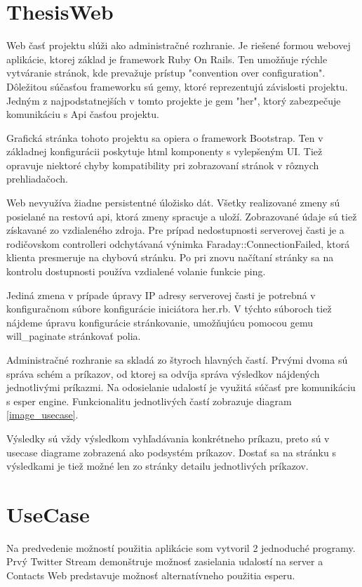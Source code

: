 \section{ThesisWeb}
	Web časť projektu slúži ako administračné rozhranie. Je riešené formou webovej aplikácie, ktorej základ je framework Ruby On Rails. Ten umožňuje rýchle vytváranie stránok, kde prevažuje prístup "convention over configuration". Dôležitou súčasťou frameworku sú gemy, ktoré reprezentujú závislosti projektu. Jedným z najpodstatnejších v tomto projekte je gem "her", ktorý zabezpečuje komunikáciu s Api časťou projektu.
	
	
	Grafická stránka tohoto projektu sa opiera o framework Bootstrap. Ten v základnej konfigurácii poskytuje html komponenty s vylepšeným UI. Tiež opravuje niektoré chyby kompatibility pri zobrazovaní stránok v rôznych prehliadačoch.
	
	Web nevyužíva žiadne persistentné úložisko dát. Všetky realizované zmeny sú posielané na restovú api, ktorá zmeny spracuje a uloží. Zobrazované údaje sú tiež získavané zo vzdialeného zdroja.
	Pre prípad nedostupnosti serverovej časti je a rodičovskom controlleri odchytávaná výnimka Faraday::ConnectionFailed, ktorá klienta presmeruje na chybovú stránku. Po pri znovu načítaní stránky sa na kontrolu dostupnosti používa vzdialené volanie funkcie ping.
	
	Jediná zmena v prípade úpravy IP adresy serverovej časti je potrebná v konfiguračnom súbore konfigurácie iniciátora her.rb. V týchto súboroch tiež nájdeme úpravu konfigurácie stránkovanie, umožňujúcu pomocou gemu will\_paginate stránkovať polia.

	Administračné rozhranie sa skladá zo štyroch hlavných častí. Prvými dvoma sú správa schém a príkazov, od ktorej sa odvíja správa výsledkov nájdených jednotlivými príkazmi. Na odosielanie udalostí je využitá súčasť pre komunikáciu s esper engine. Funkcionalitu jednotlivých častí zobrazuje diagram \ref{image_usecase}.
	
	Výsledky sú vždy výsledkom vyhľadávania konkrétneho príkazu, preto sú v usecase diagrame zobrazená ako podsystém príkazov. Dostať sa na stránku s výsledkami je tiež možné len zo stránky detailu jednotlivých príkazov.

\section{UseCase}
	Na predvedenie možností použitia aplikácie som vytvoril 2 jednoduché programy. Prvý Twitter Stream demonštruje možnosť zasielania udalostí na server a Contacts Web predstavuje možnosť alternatívneho použitia esperu. 
	

